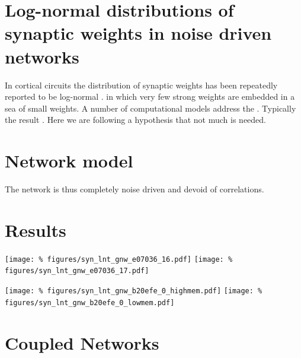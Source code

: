 \columnbreak
\section*{\LARGE Log-normal distributions of synaptic weights in noise driven networks}

In cortical circuits the distribution of synaptic weights has been repeatedly reported to be log-normal \cite{Song2005}. in which very few strong weights are embedded in a sea of small weights. A number of computational models address the . Typically the result . Here we are following a hypothesis that not much is needed.


\section*{Network model}

The network is thus completely noise driven and devoid of correlations.



\section*{Results}

\begin{center}\vspace{1cm}
  \texttt{[image: \%
    figures/syn\_lnt\_gnw\_e07036\_16.pdf]}
  \texttt{[image: \%
    figures/syn\_lnt\_gnw\_e07036\_17.pdf]}

\end{center}\vspace{1cm}


\begin{center}\vspace{1cm}
  \texttt{[image: \%
    figures/syn\_lnt\_gnw\_b20efe\_0\_highmem.pdf]}
  \texttt{[image: \%
    figures/syn\_lnt\_gnw\_b20efe\_0\_lowmem.pdf]}

\end{center}\vspace{1cm}


\section*{Coupled Networks}

